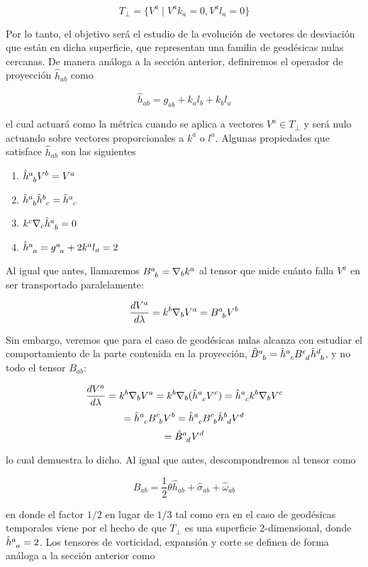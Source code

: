 \[ T_\perp=\{V^a \mid V^ak_a=0, V^al_a=0\} \]


Por lo tanto, el objetivo será el estudio de la evolución de vectores de desviación que están en dicha superficie, que representan una familia de geodésicas nulas cercanas. De manera análoga a la sección anterior, definiremos el operador de proyección $\hat{h}_{ab}$ como

\[ \hat{h}_{ab}=g_{ab}+k_al_b+k_bl_a \]


el cual actuará como la métrica cuando se aplica a vectores $V^a \in T_\perp$ y será nulo actuando sobre vectores proporcionales a $k^a$ o $l^a$. Algunas propiedades que satisface $\hat{h}_{ab}$ son las siguientes


\begin{enumerate}[1)]
    \item $\tensor{\hat{h}}{^a_b}V^b=V^a$
    \item $\tensor{\hat{h}}{^a_b}\tensor{\hat{h}}{^b_c}=\tensor{\hat{h}}{^a_c}$
    \item $k^c\nabla_c\tensor{\hat{h}}{^a_b}=0$
    \item $\tensor{\hat{h}}{^a_a}=\tensor{g}{^a_a}+2k^al_a=2$
\end{enumerate}

Al igual que antes, llamaremos $\tensor{B}{^a_b}=\nabla_bk^a$ al tensor que mide cuánto falla $V^a$ en ser transportado paralelamente:

\[ \frac{dV^a}{d\lambda}=k^b\nabla_bV^a=\tensor{B}{^a_b}V^b  \]

Sin embargo, veremos que para el caso de geodésicas nulas alcanza con estudiar el comportamiento de la parte contenida en la proyección, $\tensor{\hat{B}}{^a_b}=\tensor{\hat{h}}{^a_c}\tensor{B}{^c_d}\tensor{\hat{h}}{^d_b}$, y no todo el tensor $B_{ab}$:


$$
\frac{dV^a}{d\lambda}=k^b\nabla_bV^a=k^b\nabla_b(\tensor{\hat{h}}{^a_c}V^c)=\tensor{\hat{h}}{^a_c}k^b\nabla_bV^c
$$
$$
=\tensor{\hat{h}}{^a_c}\tensor{B}{^c_b}V^b=\tensor{\hat{h}}{^a_c}\tensor{B}{^c_b}\tensor{\hat{h}}{^b_d}V^d
$$
$$
=\tensor{\hat{B}}{^a_d}V^d
$$

lo cual demuestra lo dicho. Al igual que antes, descompondremos al tensor como

\[ \hat{B}_{ab}=\frac{1}{2}\theta\hat{h}_{ab}+\hat{\sigma}_{ab}+\hat{\omega}_{ab} \]

en donde el factor $1/2$ en lugar de $1/3$ tal como era en el caso de geodésicas temporales viene por el hecho de que $T_\perp$ es una superficie 2-dimensional, donde $\tensor{\hat{h}}{^a_a}=2$. Los tensores de vorticidad, expansión y corte se definen de forma análoga a la sección anterior como


